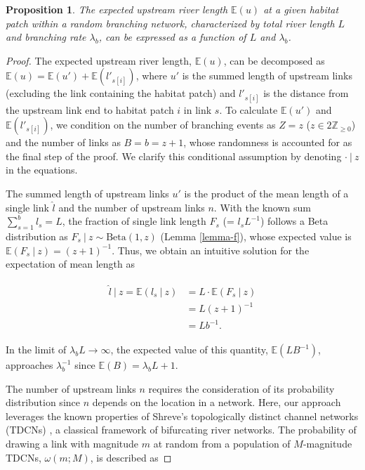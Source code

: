 \documentclass[11pt, class=article, crop=false]{standalone}
\newtheorem{proposition}{Proposition}[subsection]
\theoremstyle{definition}
\begin{document}
\begin{proposition}
The expected upstream river length $\mathbb{E}(u)$ at a given habitat patch within a random branching network, characterized by total river length $L$ and branching rate $\lambda_b$, can be expressed as a function of $L$ and $\lambda_b$.
\end{proposition}

\begin{proof}
The expected upstream river length, $\mathbb{E}(u)$, can be decomposed as $\mathbb{E}(u) = \mathbb{E}(u') + \mathbb{E}(l'_{s[i]})$, where $u'$ is the summed length of upstream links (excluding the link containing the habitat patch) and $l'_{s[i]}$ is the distance from the upstream link end to habitat patch $i$ in link $s$.
To calculate $\mathbb{E}(u')$ and $\mathbb{E}(l'_{s[i]})$, we condition on the number of branching events as $Z = z$ ($z \in 2\mathbb{Z}_{\ge 0}$) and the number of links as $B = b = z + 1$, whose randomness is accounted for as the final step of the proof.
We clarify this conditional assumption by denoting $\cdot ~|~ z$ in the equations.

The summed length of upstream links $u'$ is the product of the mean length of a single link $\hat{l}$ and the number of upstream links $n$.
With the known sum $\sum_{s=1}^b l_s = L$, the fraction of single link length $F_s$ (= $l_s L^{-1}$) follows a Beta distribution as $F_s ~|~ z \sim \mbox{Beta}(1, z)$ (Lemma \ref{lemma-f}), whose expected value is $\mathbb{E}(F_s~|~z) = (z + 1)^{-1}$.
Thus, we obtain an intuitive solution for the expectation of mean length as

\begin{align}
    \begin{split}
    \hat{l}~|~z = \mathbb{E}(l_s~|~z) &= L \cdot \mathbb{E}(F_s~|~z)\\
                                      &= L(z + 1)^{-1}\\
                                      &= Lb^{-1}.
    \end{split}
\end{align}

In the limit of $\lambda_b L \rightarrow \infty$, the expected value of this quantity, $\mathbb{E}(LB^{-1})$, approaches $\lambda_b^{-1}$ since $\mathbb{E}(B) = \lambda_b L + 1$.

The number of upstream links $n$ requires the consideration of its probability distribution since $n$ depends on the location in a network.
Here, our approach leverages the known properties of Shreve's topologically distinct channel networks (TDCNs) \citep{shreve_infinite_1967}, a classical framework of bifurcating river networks.
The probability of drawing a link with magnitude $m$ at random from a population of $M$-magnitude TDCNs, $\omega(m; M)$, is described as


\end{proof}
\end{document}
